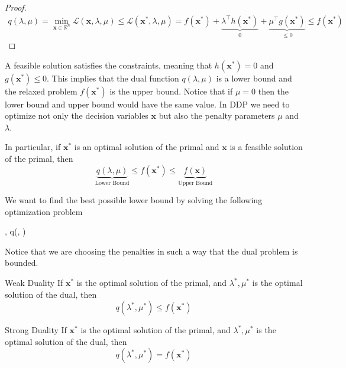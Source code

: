 \begin{proof}
\begin{align}
    q(\lambda, \mu) = \min_{\mathbf{x}\in \mathbb{R}^{n}} \mathcal{L}(\mathbf{x}, \lambda, \mu) \leq \mathcal{L}(\mathbf{x}^{*}, \lambda, \mu) = f(\mathbf{x}^{*}) + \underbrace{\lambda^{\intercal}h(\mathbf{x}^{*})}_{0} + \underbrace{\mu^{\intercal}g(\mathbf{x}^{*})}_{\leq 0} \leq f(\mathbf{x}^{*})
\end{align}
\end{proof}
A feasible solution satisfies the constraints, meaning that $h(\mathbf{x}^{*})=0$ and $g(\mathbf{x}^{*}) \leq 0$. This implies that the dual function $q(\lambda,\mu)$ is a lower bound and the relaxed problem $f(\mathbf{x}^{*})$ is the upper bound. Notice that if $\mu = 0$ then the lower bound and upper bound would have the same value. In DDP we need to optimize not only the decision variables $\mathbf{x}$ but also the penalty parameters $\mu$ and $\lambda$.
\begin{corollary}{}{}
  In particular, if $\mathbf{x}^{*}$ is an optimal solution of the primal and $\mathbf{x}$ is a feasible solution of the primal, then
  \begin{equation}
      \underbrace{q({\lambda,\mu})}_{\text{Lower Bound}} \leq f(\mathbf{x}^{*}) \leq \underbrace{f(\mathbf{x})}_{\text{Upper Bound}}
  \end{equation}
\end{corollary}
We want to find the best possible lower bound by solving the following optimization problem
\begin{maxi!}[2]
	{\lambda, \mu}{q(\lambda, \mu)}{\label{eq: Abstract_Dual}}{}{}
\end{maxi!}
Notice that we are choosing the penalties in such a way that the dual problem is bounded.
\begin{theorem}{Weak Duality}{}
If $\mathbf{x}^{*}$ is the optimal solution of the primal, and $\lambda^{*}, \mu^{*}$ is the optimal solution of the dual, then
\begin{equation}
    q(\lambda^{*}, \mu^{*}) \leq f(\mathbf{x}^{*})
\end{equation}
\end{theorem}
\begin{theorem}{Strong Duality}{}
If $\mathbf{x}^{*}$ is the optimal solution of the primal, and $\lambda^{*}, \mu^{*}$ is the optimal solution of the dual, then
\begin{equation}
    q(\lambda^{*}, \mu^{*}) = f(\mathbf{x}^{*})
\end{equation}
\end{theorem}
